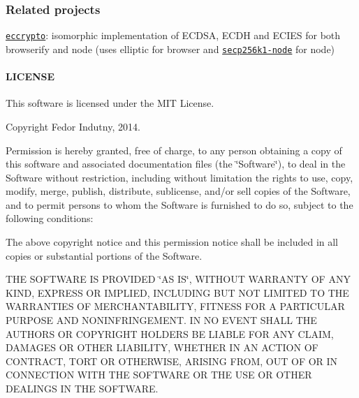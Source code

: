 \subsubsection*{Related projects}


\begin{DoxyItemize}
\item \href{https://github.com/bitchan/eccrypto}{\tt eccrypto}\+: isomorphic implementation of E\+C\+D\+SA, E\+C\+DH and E\+C\+I\+ES for both browserify and node (uses {\ttfamily elliptic} for browser and \href{https://github.com/wanderer/secp256k1-node}{\tt secp256k1-\/node} for node)
\end{DoxyItemize}

\paragraph*{L\+I\+C\+E\+N\+SE}

This software is licensed under the M\+IT License.

Copyright Fedor Indutny, 2014.

Permission is hereby granted, free of charge, to any person obtaining a copy of this software and associated documentation files (the \char`\"{}\+Software\char`\"{}), to deal in the Software without restriction, including without limitation the rights to use, copy, modify, merge, publish, distribute, sublicense, and/or sell copies of the Software, and to permit persons to whom the Software is furnished to do so, subject to the following conditions\+:

The above copyright notice and this permission notice shall be included in all copies or substantial portions of the Software.

T\+HE S\+O\+F\+T\+W\+A\+RE IS P\+R\+O\+V\+I\+D\+ED \char`\"{}\+A\+S I\+S\char`\"{}, W\+I\+T\+H\+O\+UT W\+A\+R\+R\+A\+N\+TY OF A\+NY K\+I\+ND, E\+X\+P\+R\+E\+SS OR I\+M\+P\+L\+I\+ED, I\+N\+C\+L\+U\+D\+I\+NG B\+UT N\+OT L\+I\+M\+I\+T\+ED TO T\+HE W\+A\+R\+R\+A\+N\+T\+I\+ES OF M\+E\+R\+C\+H\+A\+N\+T\+A\+B\+I\+L\+I\+TY, F\+I\+T\+N\+E\+SS F\+OR A P\+A\+R\+T\+I\+C\+U\+L\+AR P\+U\+R\+P\+O\+SE A\+ND N\+O\+N\+I\+N\+F\+R\+I\+N\+G\+E\+M\+E\+NT. IN NO E\+V\+E\+NT S\+H\+A\+LL T\+HE A\+U\+T\+H\+O\+RS OR C\+O\+P\+Y\+R\+I\+G\+HT H\+O\+L\+D\+E\+RS BE L\+I\+A\+B\+LE F\+OR A\+NY C\+L\+A\+IM, D\+A\+M\+A\+G\+ES OR O\+T\+H\+ER L\+I\+A\+B\+I\+L\+I\+TY, W\+H\+E\+T\+H\+ER IN AN A\+C\+T\+I\+ON OF C\+O\+N\+T\+R\+A\+CT, T\+O\+RT OR O\+T\+H\+E\+R\+W\+I\+SE, A\+R\+I\+S\+I\+NG F\+R\+OM, O\+UT OF OR IN C\+O\+N\+N\+E\+C\+T\+I\+ON W\+I\+TH T\+HE S\+O\+F\+T\+W\+A\+RE OR T\+HE U\+SE OR O\+T\+H\+ER D\+E\+A\+L\+I\+N\+GS IN T\+HE S\+O\+F\+T\+W\+A\+RE. 